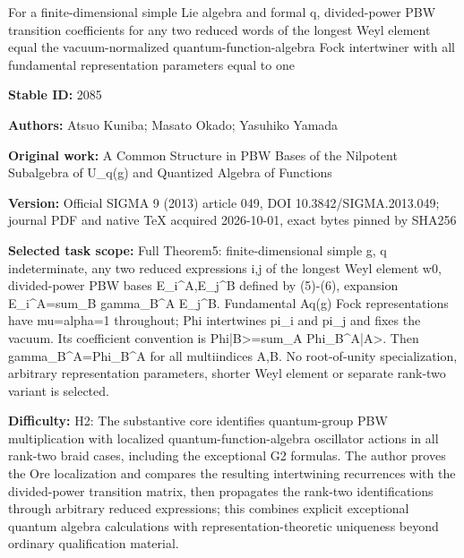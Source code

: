 \documentclass[11pt]{article}
\begin{document}
\begin{center}\Large For a finite-dimensional simple Lie algebra and formal q, divided-power PBW transition coefficients for any two reduced words of the longest Weyl element equal the vacuum-normalized quantum-function-algebra Fock intertwiner with all fundamental representation parameters equal to one\end{center}
\noindent\textbf{Stable ID:} 2085\par
\noindent\textbf{Authors:} Atsuo Kuniba; Masato Okado; Yasuhiko Yamada\par
\noindent\textbf{Original work:} A Common Structure in PBW Bases of the Nilpotent Subalgebra of U\_q(g) and Quantized Algebra of Functions\par
\noindent\textbf{Version:} Official SIGMA 9 (2013) article 049, DOI 10.3842/SIGMA.2013.049; journal PDF and native TeX acquired 2026-10-01, exact bytes pinned by SHA256\par
\noindent\textbf{Selected task scope:} Full Theorem5: finite-dimensional simple g, q indeterminate, any two reduced expressions i,j of the longest Weyl element w0, divided-power PBW bases E\_i\textasciicircum{}A,E\_j\textasciicircum{}B defined by (5)-(6), expansion E\_i\textasciicircum{}A=\allowbreak{}sum\_B gamma\_B\textasciicircum{}A E\_j\textasciicircum{}B. Fundamental Aq(g) Fock representations have mu=\allowbreak{}alpha=\allowbreak{}1 throughout; Phi intertwines pi\_i and pi\_j and fixes the vacuum. Its coefficient convention is Phi|B>=\allowbreak{}sum\_A Phi\_B\textasciicircum{}A|A>. Then gamma\_B\textasciicircum{}A=\allowbreak{}Phi\_B\textasciicircum{}A for all multiindices A,B. No root-of-unity specialization, arbitrary representation parameters, shorter Weyl element or separate rank-two variant is selected.\par
\noindent\textbf{Difficulty:} H2: The substantive core identifies quantum-group PBW multiplication with localized quantum-function-algebra oscillator actions in all rank-two braid cases, including the exceptional G2 formulas. The author proves the Ore localization and compares the resulting intertwining recurrences with the divided-power transition matrix, then propagates the rank-two identifications through arbitrary reduced expressions; this combines explicit exceptional quantum algebra calculations with representation-theoretic uniqueness beyond ordinary qualification material.\par
\end{document}
